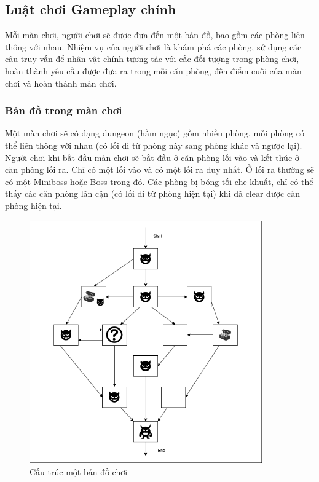 \subsection{Luật chơi Gameplay chính}
\hspace*{0.5cm} Mỗi màn chơi, người chơi sẽ được đưa đến một bản đồ, bao gồm các phòng liên thông với nhau. Nhiệm vụ của người chơi là khám phá các phòng, sử dụng các câu truy vấn để nhân vật chính tương tác với cắc đối tượng trong phòng chơi, hoàn thành yêu cầu được đưa ra trong mỗi căn phòng, đến điểm cuối của màn chơi và hoàn thành màn chơi.

\subsubsection{Bản đồ trong màn chơi}
\hspace*{0.5cm} Một màn chơi sẽ có dạng dungeon (hầm ngục) gồm nhiều phòng, mỗi phòng có thể liên thông với nhau (có lối đi từ phòng này sang phòng khác và ngược lại). Người chơi khi bắt đầu màn chơi sẽ bắt đầu ở căn phòng lối vào và kết thúc ở căn phòng lối ra. Chỉ có một lối vào và có một lối ra duy nhất. Ở lối ra thường sẽ có một Miniboss hoặc Boss trong đó. Các phòng bị bóng tối che khuất, chỉ có thể thấy các căn phòng lân cận (có lối đi từ phòng hiện tại) khi đã clear được căn phòng hiện tại.\\

\begin{figure}[H]
	\centering
	\includegraphics[width=10cm]{Images/SampleLevel.png}
	\vspace{0.5cm}
	\caption{Cấu trúc một bản đồ chơi}
\end{figure}

